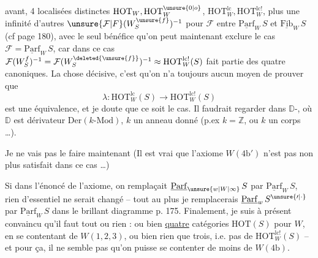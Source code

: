 avant, 4 localisées  distinctes $\mathrm{HOT}_W,\mathrm{HOT}_W^{\unsure{0|o}}$,
$\mathrm{HOT}_W^{\mathrm{lc}},\mathrm{HOT}_W^{\mathrm{lc}!}$, plus une infinité d'autres 
$\unsure{\mathcal{F}|F}(W_S^{\unsure{f}})^{-1}$ pour $\mathcal{F}$ entre $\underline{\mathrm{Parf}}_W\,S$ et $\underline{\mathrm{Fib}}_W\,S$ (cf page 180),
avec le seul bénéfice qu'on peut maintenant exclure
le cas $\mathcal{F}=\underline{\mathrm{Parf}}_W\,S$, car dans ce cas $\mathcal{F}(W_S^f)^{-1}=\mathcal{F}(W_S^{\deleted{\unsure{f}}})^{-1}
\approx\mathrm{HOT}_W^{\mathrm{lc}!}(S)$ fait partie des quatre canoniques. La
chose décisive, c'est qu'on n'a toujours aucun moyen
de prouver que
\[
\lambda:\mathrm{HOT}_W^{\mathrm{lc}}(S)\longrightarrow\mathrm{HOT}_W^{\mathrm{lc}!}(S)
\]
est une équivalence, et je doute que  ce soit
le cas. Il faudrait regarder dans   $\mathbb{D}$-,
où $\mathbb{D}$ est  dérivateur $\mathrm{Der}(k\text{-}\mathrm{Mod})$, $k$ un
anneau donné (p.ex $k=\mathbb{Z}$, ou $k$ un corps \ldots).

 Je ne vais pas le faire maintenant
 (Il est vrai que l'axiome $W(4\mathrm b')$ n'est
pas non plus satisfait dans ce cas \ldots)

Si dans l'énoncé de l'axiome, on remplaçait
$\underline{\mathrm{Parf}}_{\unsure{w|W|\infty}}\,S$ par $\underline{\mathrm{Parf}}_W\,S$, rien d'essentiel ne serait
changé -- tout au plus je remplacerais $\underline{\mathrm{Parf}}_w\,S^{\unsure{\prime|\cdot}}$ par
$\underline{\mathrm{Parf}}_W\,S$ dans le brillant diagramme p. 175. Finalement, je suis à présent convaincu qu'il faut
tout ou rien : ou bien \uline{quatre} catégories $\mathrm{HOT}(S)$
pour $W$, en se contentant de $W(1,2,3)$, ou
bien rien que trois, i.e. pas de $\mathrm{HOT}_W^{\mathrm{lc}!}(S)$ --
et pour ça, il ne semble pas qu'on puisse se
contenter de moins de $W(4\mathrm b)$.

